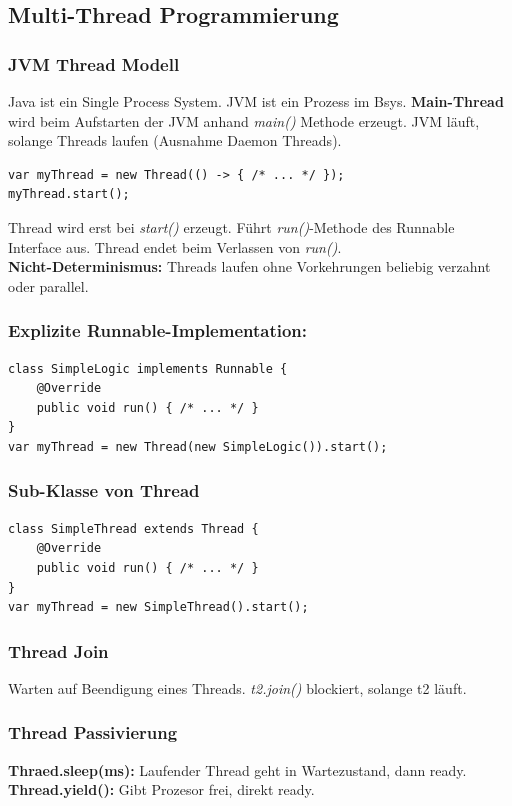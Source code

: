 \subsection{Multi-Thread Programmierung}
\subsubsection{JVM Thread Modell}
Java ist ein Single Process System. 
JVM ist ein Prozess im Bsys.
\textbf{Main-Thread} wird beim Aufstarten der JVM anhand \textit{main()} Methode erzeugt.
JVM läuft, solange Threads laufen (Ausnahme Daemon Threads).
\begin{lstlisting}
var myThread = new Thread(() -> { /* ... */ });
myThread.start();
\end{lstlisting}
Thread wird erst bei \textit{start()} erzeugt. Führt \textit{run()}-Methode des Runnable Interface aus.
Thread endet beim Verlassen von \textit{run()}.\\
\textbf{Nicht-Determinismus:} Threads laufen ohne Vorkehrungen beliebig verzahnt oder parallel.
\subsubsection{Explizite Runnable-Implementation:}
\begin{lstlisting}
class SimpleLogic implements Runnable {
    @Override
    public void run() { /* ... */ }
}
var myThread = new Thread(new SimpleLogic()).start();
\end{lstlisting}

\subsubsection{Sub-Klasse von Thread}
\begin{lstlisting}
class SimpleThread extends Thread {
    @Override 
    public void run() { /* ... */ }
}
var myThread = new SimpleThread().start();
\end{lstlisting}

\subsubsection{Thread Join}
Warten auf Beendigung eines Threads. \textit{t2.join()} blockiert, solange t2 läuft.

\subsubsection{Thread Passivierung}
\textbf{Thraed.sleep(ms):} Laufender Thread geht in Wartezustand, dann ready.
\textbf{Thread.yield():} Gibt Prozesor frei, direkt ready.